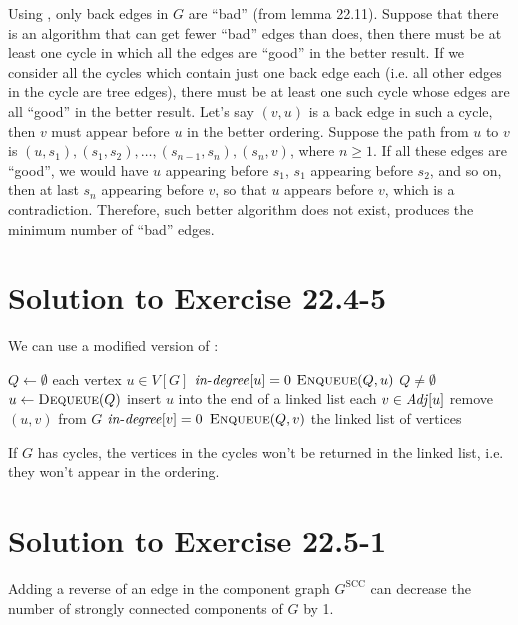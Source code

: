 \documentclass[a4paper, fleqn]{article}
\begin{document}
Using , only back edges in $G$ are ``bad'' (from lemma 22.11). Suppose that there is an algorithm that can get fewer ``bad'' edges than  does, then there must be at least one cycle in which all the edges are ``good'' in the better result. If we consider all the cycles which contain just one back edge each (i.e. all other edges in the cycle are tree edges), there must be at least one such cycle whose edges are all ``good'' in the better result. Let's say $(v, u)$ is a back edge in such a cycle, then $v$ must appear before $u$ in the better ordering. Suppose the path from $u$ to $v$ is $(u, s_1), (s_1, s_2), \ldots, (s_{n-1}, s_n), (s_n, v)$, where $n \geq 1$. If all these edges are ``good'', we would have $u$ appearing before $s_1$, $s_1$ appearing before $s_2$, and so on, then at last $s_n$ appearing before $v$, so that $u$ appears before $v$, which is a contradiction. Therefore, such better algorithm does not exist,  produces the minimum number of ``bad'' edges.


\section*{Solution to Exercise 22.4-5}

We can use a modified version of :

\begin{codebox}
\li $Q \gets \emptyset$
\li \For each vertex $u \in V[G]$
\li   \Do
        \If $\id{in-degree}[u] = 0$
\li       \Then
            $\textnormal{\scshape Enqueue}(Q, u)$
          \End
      \End
\li \While $Q \neq \emptyset$
\li   \Do
        $u \gets \textnormal{\scshape Dequeue}(Q)$
\li     insert $u$ into the end of a linked list
\li     \For each $v \in \id{Adj}[u]$
\li       \Do
            remove $(u, v)$ from $G$
\li         \If $\id{in-degree}[v] = 0$
\li           \Then
                $\textnormal{\scshape Enqueue}(Q, v)$
              \End
          \End
      \End
\li \Return the linked list of vertices
\end{codebox}

If $G$ has cycles, the vertices in the cycles won't be returned in the linked list, i.e. they won't appear in the ordering.


\section*{Solution to Exercise 22.5-1}

Adding a reverse of an edge in the component graph $G^{\mbox{SCC}}$ can decrease the number of strongly connected components of $G$ by 1.
\end{document}
